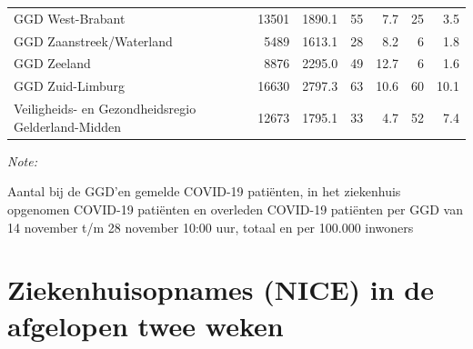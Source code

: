\documentclass[
  english,
  man,floatsintext]{apa6}
\begin{document}
\begin{table}
\begin{threeparttable}
\begin{tabular}{lrrrrrr}
GGD West-Brabant & 13501 & 1890.1 & 55 & 7.7 & 25 & 3.5\\
GGD Zaanstreek/Waterland & 5489 & 1613.1 & 28 & 8.2 & 6 & 1.8\\
GGD Zeeland & 8876 & 2295.0 & 49 & 12.7 & 6 & 1.6\\
GGD Zuid-Limburg & 16630 & 2797.3 & 63 & 10.6 & 60 & 10.1\\
Veiligheids- en Gezondheidsregio Gelderland-Midden & 12673 & 1795.1 & 33 & 4.7 & 52 & 7.4\\
\bottomrule
\end{tabular}
\begin{tablenotes}
\item \textit{Note: } 
\item Aantal bij de GGD’en gemelde COVID-19 patiënten, in het ziekenhuis opgenomen COVID-19 patiënten en overleden COVID-19 patiënten per GGD van 14 november t/m 28 november 10:00 uur, totaal en per 100.000 inwoners
\end{tablenotes}
\end{threeparttable}
\endgroup{}
\end{table}

\newpage

\hypertarget{ziekenhuisopnames-nice-in-de-afgelopen-twee-weken}{%
\section{Ziekenhuisopnames (NICE) in de afgelopen twee weken}\label{ziekenhuisopnames-nice-in-de-afgelopen-twee-weken}}
\end{document}

